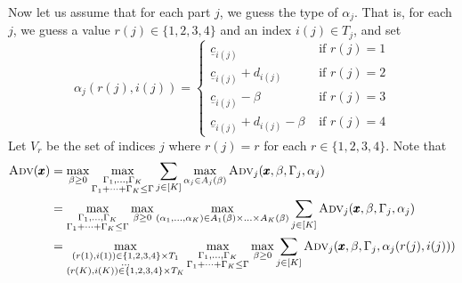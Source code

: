 Now let us assume that for each part $j$, we guess the type of $\alpha_j$. That is, for each $j$, we guess a value $r(j)\in\{1,2,3,4\}$ and an index $i(j)\in T_j$, and set 
\[ \alpha_j(r(j),i(j)) = \begin{cases}
\underline{c}_{i(j)} & \text{ if } r(j)=1 \\
\underline{c}_{i(j)} + d_{i(j)} & \text{ if } r(j) = 2 \\
\underline{c}_{i(j)} - \beta & \text{ if } r(j)=3 \\
\underline{c}_{i(j)} + d_{i(j)} - \beta & \text{ if } r(j) = 4
\end{cases} \]
Let $V_r$ be the set of indices $j$ where $r(j) = r$ for each $r\in\{1,2,3,4\}$. Note that
\begin{align}\label{eq:ad-rj-ij}
\textsc{Adv}(\pmb{x}) &= \max_{\beta \ge 0} \max_{\substack{\Gamma_1,\ldots,\Gamma_K\\ \Gamma_1 + \dots + \Gamma_K \leq \Gamma}}  \sum_{j\in[K]}  \max_{\alpha_j \in A_j(\beta)} \textsc{Adv}_j(\pmb{x},\beta,\Gamma_j,\alpha_j)  \\
&= \max_{\substack{\Gamma_1,\ldots,\Gamma_K\\ \Gamma_1 + \dots + \Gamma_K \leq \Gamma}} 
\max_{\beta \ge 0} 
 \max_{(\alpha_1,\ldots,\alpha_K) \in A_1(\beta)\times\ldots\times A_K(\beta)}
\sum_{j\in[K]}
\textsc{Adv}_j(\pmb{x},\beta,\Gamma_j,\alpha_j) \nonumber \\
&= \max_{\substack{(r(1),i(1)) \in \{1,2,3,4\}\times T_1 \\ \ldots \\(r(K),i(K)) \in \{1,2,3,4\}\times T_K}}
\max_{\substack{\Gamma_1,\ldots,\Gamma_K\\ \Gamma_1 + \dots + \Gamma_K \leq \Gamma}} 
\max_{\beta \ge 0} 
\sum_{j\in[K]}
\textsc{Adv}_j(\pmb{x},\beta,\Gamma_j,\alpha_j(r(j),i(j))) \nonumber
\end{align}

